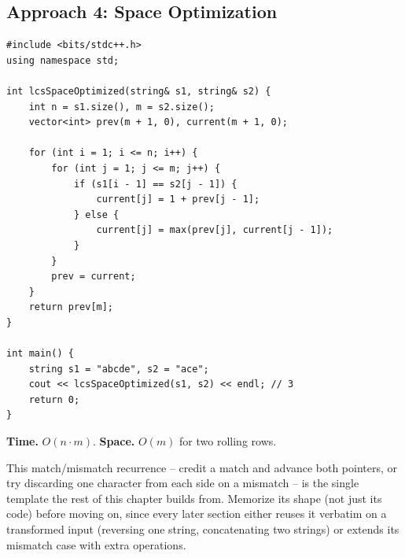 \subsection*{Approach 4: Space Optimization}

\begin{lstlisting}
#include <bits/stdc++.h>
using namespace std;

int lcsSpaceOptimized(string& s1, string& s2) {
    int n = s1.size(), m = s2.size();
    vector<int> prev(m + 1, 0), current(m + 1, 0);

    for (int i = 1; i <= n; i++) {
        for (int j = 1; j <= m; j++) {
            if (s1[i - 1] == s2[j - 1]) {
                current[j] = 1 + prev[j - 1];
            } else {
                current[j] = max(prev[j], current[j - 1]);
            }
        }
        prev = current;
    }
    return prev[m];
}

int main() {
    string s1 = "abcde", s2 = "ace";
    cout << lcsSpaceOptimized(s1, s2) << endl; // 3
    return 0;
}
\end{lstlisting}

\begin{complexitybox}
\textbf{Time.} $O(n \cdot m)$.
\textbf{Space.} $O(m)$ for two rolling rows.
\end{complexitybox}

\begin{takeawaybox}
This match/mismatch recurrence -- credit a match and advance both
pointers, or try discarding one character from each side on a mismatch
-- is the single template the rest of this chapter builds from. Memorize
its shape (not just its code) before moving on, since every later
section either reuses it verbatim on a transformed input (reversing one
string, concatenating two strings) or extends its mismatch case with
extra operations.
\end{takeawaybox}
